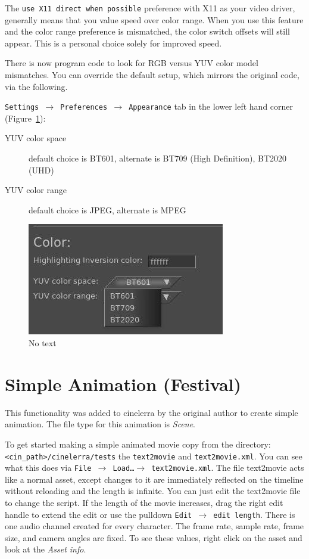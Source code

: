 The \texttt{use X11 direct when possible} preference with X11 as your video driver, generally means that you value speed over color range.  When you use this feature and the color range preference is mismatched, the color switch offsets will still appear.  This is a personal choice solely for improved speed.

There is now program code to look for RGB versus YUV color model mismatches.  You can override the default setup, which mirrors the original code, via the following.

\texttt{Settings $\rightarrow$ Preferences $\rightarrow$ Appearance} tab in the lower left hand corner (Figure~\ref{fig:color}):

\begin{description}
    \item[YUV color space] default choice is BT601, alternate is BT709 (High Definition), BT2020 (UHD)
    \item[YUV color range] default choice is JPEG,   alternate is MPEG
\end{description}


\begin{figure}[htpb]
    \centering
    \includegraphics[width=0.6\linewidth,keepaspectratio]{images/color.png}
    \captionsetup{labelformat=empty, textformat=empty}
    \caption[Color space and Color range]{No text}    
    \label{fig:color}
\end{figure}

\section{Simple Animation (Festival)}%
\label{sec:simple_animation_festival}

This functionality was added to cinelerra by the original author to create simple animation.  The file type for this animation is \textit{Scene}.

To get started making a simple animated movie copy from the directory: \texttt{<cin\_path>/cinelerra/tests} the \texttt{text2movie} and \texttt{text2movie.xml}.  You can see what this does via \texttt{File $\rightarrow$ Load\dots $\rightarrow$ text2movie.xml}.  The file text2movie acts like a normal asset, except changes to it are immediately reflected on the timeline without reloading and the length is infinite.  You can just edit the text2movie file to change the script.  If the length of the movie increases, drag the right edit handle to extend the edit or use the pulldown \texttt{Edit $\rightarrow$ edit length}. There is one audio channel created for every character.  The frame rate, sample rate, frame size, and camera angles are fixed.  To see these values, right click on the asset and look at the \textit{Asset info}.

